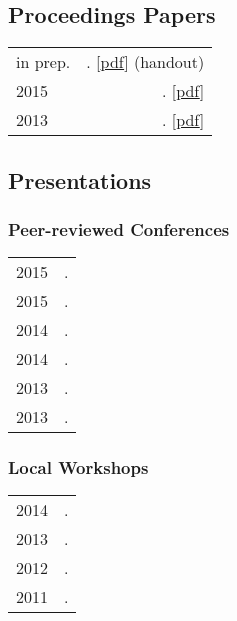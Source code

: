 \documentclass[11pt,letterpaper,twoside]{article}
\makeatletter
\newcommand{\myvrule}{\color{lightgray}\vrule width 1.0pt}
\newenvironment{cvsection}{%
  \renewcommand{\arraystretch}{1.75}
  \begin{longtable}[l]{@{} L R @{}}
}{%
  \end{longtable}
}
\makeatother
\begin{document}
\subsection*{Proceedings Papers}

\begin{cvsection}
  in prep. & \null{}.
  [\href{http://brianbuccola.com/files/buccola2015sub20.pdf}{pdf}]
  {\footnotesize (handout)} \\

  2015 & \null{}.
  [\href{http://brianbuccola.com/files/buccola2015nels45.pdf}{pdf}] \\

  2013 & \null{}.
  [\href{http://brianbuccola.com/files/buccola2013fg.pdf}{pdf}] \\
\end{cvsection}

\subsection*{Presentations}

\subsubsection*{Peer-reviewed Conferences}

\begin{cvsection}
  2015 & \null{}. \\
  2015 & \null{}. \\
  2014 & \null{}. \\
  2014 & \null{}. \\
  2013 & \null{}. \\
  2013 & \null{}. \\
\end{cvsection}

\subsubsection*{Local Workshops}

\begin{cvsection}
  2014 & \null{}. \\
  2013 & \null{}. \\
  2012 & \null{}. \\
  2011 & \null{}. \\
\end{cvsection}
\end{document}
